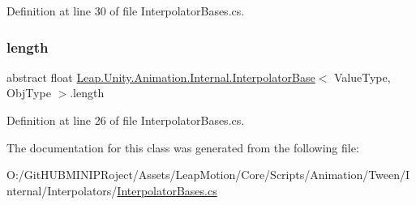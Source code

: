 Definition at line 30 of file Interpolator\+Bases.\+cs.

\mbox{\label{class_leap_1_1_unity_1_1_animation_1_1_internal_1_1_interpolator_base_ab65defbf437d15a02f3ae11b99035126}} 
\subsubsection{\texorpdfstring{length}{length}}
{\footnotesize\ttfamily abstract float \mbox{\hyperlink{class_leap_1_1_unity_1_1_animation_1_1_internal_1_1_interpolator_base}{Leap.\+Unity.\+Animation.\+Internal.\+Interpolator\+Base}}$<$ Value\+Type, Obj\+Type $>$.length\hspace{0.3cm}{\ttfamily [get]}}



Definition at line 26 of file Interpolator\+Bases.\+cs.



The documentation for this class was generated from the following file\+:\begin{DoxyCompactItemize}
\item 
O\+:/\+Git\+H\+U\+B\+M\+I\+N\+I\+P\+Roject/\+Assets/\+Leap\+Motion/\+Core/\+Scripts/\+Animation/\+Tween/\+Internal/\+Interpolators/\mbox{\hyperlink{_interpolator_bases_8cs}{Interpolator\+Bases.\+cs}}\end{DoxyCompactItemize}
